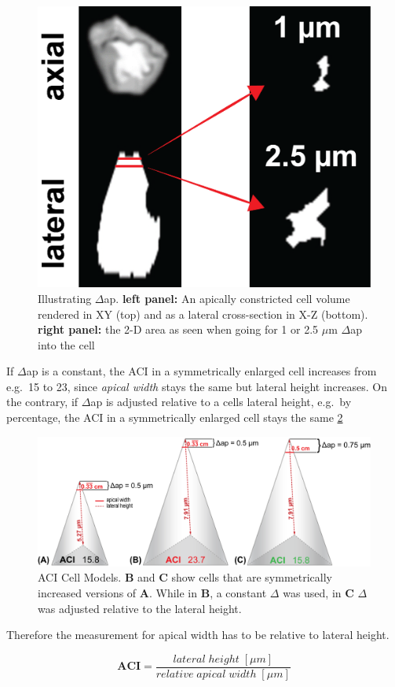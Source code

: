\documentclass[11pt,singlespacinge,twoside]{reedthesis} %
\begin{document}
\begin{figure}

{\centering \includegraphics[width=0.3\linewidth]{figure/02-MaMo/ACI/deltaap} 

}

\caption[Illustrating delta ap]{Illustrating \(\Delta\)ap. \textbf{left panel:} An apically constricted cell volume rendered in XY (top) and as a lateral cross-section in X-Z (bottom). \textbf{right panel:} the 2-D area as seen when going for 1 or 2.5 \(\mu\)m \(\Delta\)ap into the cell}\label{fig:deltaap}
\end{figure}
If \(\Delta\)ap is a constant, the ACI in a symmetrically enlarged cell increases from e.g.~15 to 23, since \emph{apical width} stays the same but lateral height increases. On the contrary, if \(\Delta\)ap is adjusted relative to a cells lateral height, e.g.~by percentage, the ACI in a symmetrically enlarged cell stays the same \ref{fig:ACICells}


\begin{figure}

{\centering \includegraphics[width=0.75\linewidth]{figure/02-MaMo/ACI/ACI_Cells} 

}

\caption[ACI Cell Models]{ACI Cell Models. \textbf{B} and \textbf{C} show cells that are symmetrically increased versions of \textbf{A}. While in \textbf{B}, a constant \(\Delta\) was used, in \textbf{C} \(\Delta\) was adjusted relative to the lateral height.}\label{fig:ACICells}
\end{figure}
Therefore the measurement for apical width has to be relative to lateral height.

\[\mathbf{ACI} = \frac{lateral\;height\;[\mu m]}{relative\;apical\;width\;[\mu m]}\]
\end{document}
